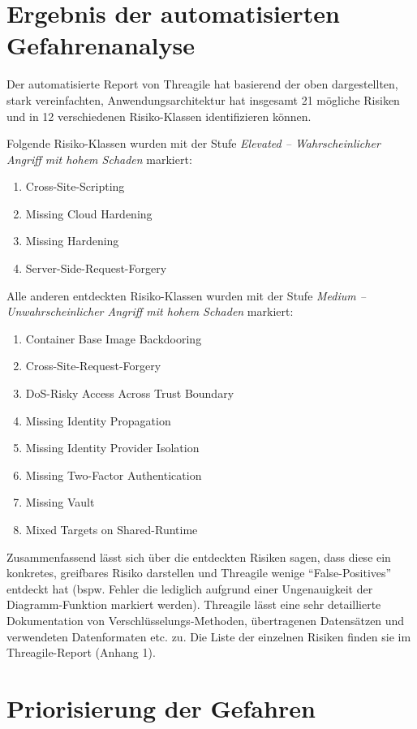 \documentclass{article}
\begin{document}
\section{Ergebnis der automatisierten Gefahrenanalyse}

Der automatisierte Report von Threagile hat basierend der oben dargestellten, stark 
vereinfachten, Anwendungsarchitektur hat insgesamt 21 mögliche Risiken und in 12 
verschiedenen Risiko-Klassen identifizieren können.

Folgende Risiko-Klassen wurden mit der Stufe \textit{Elevated – Wahrscheinlicher Angriff mit hohem Schaden} markiert:

\begin{enumerate}
	\item Cross-Site-Scripting 
	\item Missing Cloud Hardening
	\item Missing Hardening
	\item Server-Side-Request-Forgery
\end{enumerate}

Alle anderen entdeckten Risiko-Klassen wurden mit der Stufe \textit{Medium – Unwahrscheinlicher Angriff mit hohem Schaden} markiert:

\begin{enumerate}
	\item Container Base Image Backdooring
	\item Cross-Site-Request-Forgery
	\item DoS-Risky Access Across Trust Boundary
	\item Missing Identity Propagation
	\item Missing Identity Provider Isolation
	\item Missing Two-Factor Authentication
	\item Missing Vault
	\item Mixed Targets on Shared-Runtime
\end{enumerate}

Zusammenfassend lässt sich über die entdeckten Risiken sagen, dass diese ein konkretes,
greifbares Risiko darstellen und Threagile wenige ``False-Positives'' entdeckt hat (bspw. 
Fehler die lediglich aufgrund einer Ungenauigkeit der Diagramm-Funktion markiert werden). 
Threagile lässt eine sehr detaillierte Dokumentation von Verschlüsselungs-Methoden, 
übertragenen Datensätzen und verwendeten Datenformaten etc. zu. Die Liste der einzelnen 
Risiken finden sie im Threagile-Report (Anhang 1). 

\section{Priorisierung der Gefahren}
\end{document}
